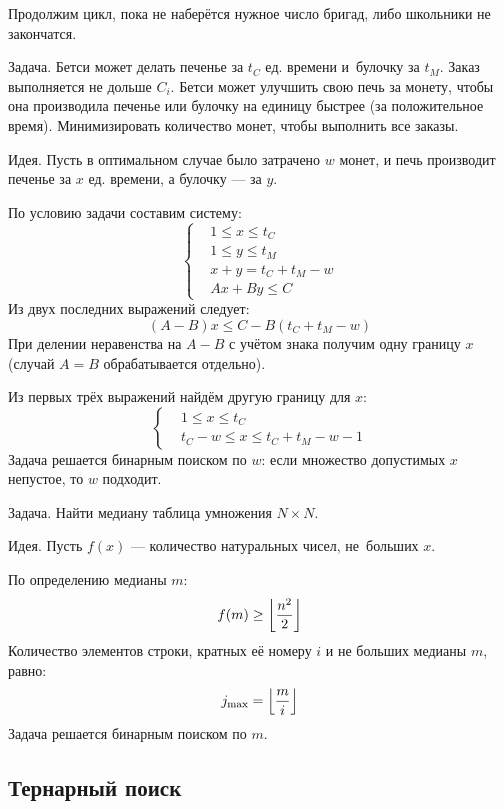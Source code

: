 Продолжим цикл, пока не {\ital наберётся} нужное число бригад, либо школьники не {\ital закончатся}.

\begin{theorem}
{\bold Задача.} Бетси может делать печенье за $t_C$ ед. времени и~булочку за $t_M$. Заказ выполняется не дольше $C_i$. Бетси может улучшить свою печь за монету, чтобы она производила печенье или булочку на единицу быстрее {\ital\color{desc}(за положительное время)}. Минимизировать количество монет, чтобы выполнить все заказы.
\end{theorem}

{\bold Идея.} Пусть в оптимальном случае было затрачено $w$ монет, и печь производит печенье за $x$ ед. времени, а булочку --- за $y$.

По условию задачи составим систему:
$$\begin{cases*}
&1\leq x\leq t_C\\
&1\leq y\leq t_M\\
&x+y=t_C+t_M-w\\
&Ax+By\leq C
\end{cases*}$$
Из двух последних выражений следует:
$$(A-B)x\leq C-B(t_C+t_M-w)$$
При делении неравенства на $A-B$ с учётом знака получим одну границу $x$ {\ital\color{desc}(случай $A=B$ обрабатывается отдельно)}.

Из первых трёх выражений найдём другую границу для $x$:
$$\begin{cases*}
&1\leq x\leq t_C\\
&t_C-w\leq x\leq t_C+t_M-w-1
\end{cases*}$$
Задача решается бинарным поиском по $w$: если множество допустимых $x$ непустое, то $w$ подходит.

\begin{theorem}
{\bold Задача.} Найти медиану таблица умножения $N\times N$.
\end{theorem}

{\bold Идея.} Пусть $f(x)$ --- количество натуральных чисел, не~больших $x$.

По определению медианы $m$:
$$f(m)\geq\left\lfloor\frac{n^2}{2}\right\rfloor$$
Количество элементов строки, кратных её номеру $i$ и не больших медианы $m$, равно:
$$j_\text{max}=\left\lfloor\frac{m}{i}\right\rfloor$$
Задача решается бинарным поиском по $m$.

\subsection{Тернарный поиск}

